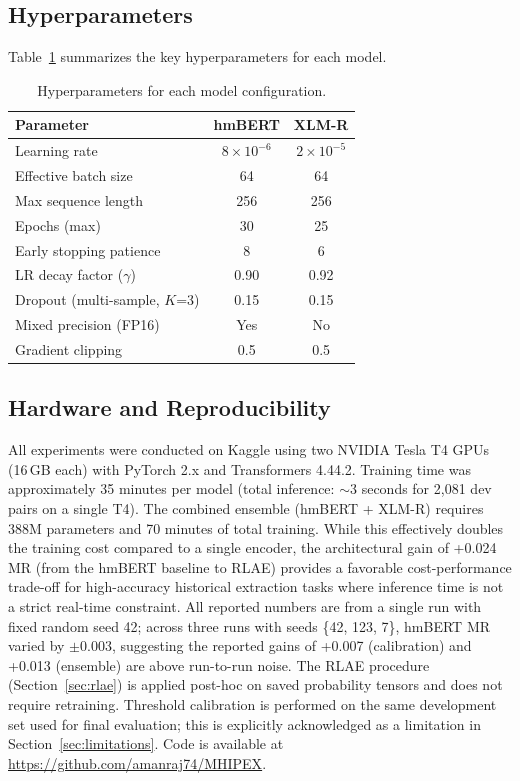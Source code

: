 \documentclass[11pt,a4paper]{article}
\begin{document}
\subsection{Hyperparameters}

Table~\ref{tab:hyper} summarizes the key hyperparameters for each model.

\begin{table}[t]
\centering
\caption{Hyperparameters for each model configuration.}
\label{tab:hyper}
\begin{tabular}{lcc}
\toprule
\textbf{Parameter} & \textbf{hmBERT} & \textbf{XLM-R} \\
\midrule
Learning rate & $8 \times 10^{-6}$ & $2 \times 10^{-5}$ \\
Effective batch size & 64 & 64 \\
Max sequence length & 256 & 256 \\
Epochs (max) & 30 & 25 \\
Early stopping patience & 8 & 6 \\
LR decay factor ($\gamma$) & 0.90 & 0.92 \\
Dropout (multi-sample, $K$=3) & 0.15 & 0.15 \\
Mixed precision (FP16) & Yes & No \\
Gradient clipping & 0.5 & 0.5 \\
\bottomrule
\end{tabular}
\end{table}

\subsection{Hardware and Reproducibility}

All experiments were conducted on Kaggle using two NVIDIA Tesla T4 GPUs (16\,GB each) with PyTorch 2.x and Transformers 4.44.2. Training time was approximately 35 minutes per model (total inference: $\sim$3 seconds for 2{,}081 dev pairs on a single T4). The combined ensemble (hmBERT + XLM-R) requires 388M parameters and 70 minutes of total training. While this effectively doubles the training cost compared to a single encoder, the architectural gain of +0.024 MR (from the hmBERT baseline to RLAE) provides a favorable cost-performance trade-off for high-accuracy historical extraction tasks where inference time is not a strict real-time constraint. All reported numbers are from a single run with fixed random seed 42; across three runs with seeds \{42, 123, 7\}, hmBERT MR varied by $\pm$0.003, suggesting the reported gains of +0.007 (calibration) and +0.013 (ensemble) are above run-to-run noise. The RLAE procedure (Section~\ref{sec:rlae}) is applied post-hoc on saved probability tensors and does not require retraining. Threshold calibration is performed on the same development set used for final evaluation; this is explicitly acknowledged as a limitation in Section~\ref{sec:limitations}. Code is available at \url{https://github.com/amanraj74/MHIPEX}.
\end{document}
